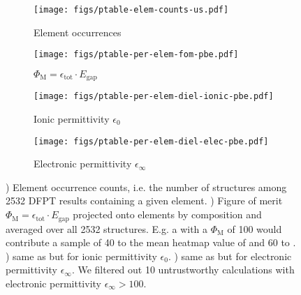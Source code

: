 \documentclass{article}
\newcommand{\fom}[1][]{\Phi_\text{M#1}}
\newcommand{\egap}{{E_\text{gap}}}
\newcommand{\epstot}{\epsilon_\text{tot}}
\begin{document}
\begin{figure}[htbp!]
    \centering
    \begin{subfigure}[b]{0.495\linewidth}
        \texttt{[image: figs/ptable-elem-counts-us.pdf]}
        \caption{Element occurrences}
        \label{fig:ptable-elem-counts-us}
    \end{subfigure}
    \begin{subfigure}[b]{0.495\linewidth}
        \texttt{[image: figs/ptable-per-elem-fom-pbe.pdf]}
        \caption{$\fom = \epstot \cdot \egap$}
        \label{fig:ptable-per-elem-fom-pbe}
    \end{subfigure}
    \begin{subfigure}[b]{0.495\linewidth}
        \texttt{[image: figs/ptable-per-elem-diel-ionic-pbe.pdf]}
        \caption{Ionic permittivity $\epsilon_0$}
        \label{fig:ptable-per-elem-diel-ionic-pbe}
    \end{subfigure}
    \begin{subfigure}[b]{0.495\linewidth}
        \texttt{[image: figs/ptable-per-elem-diel-elec-pbe.pdf]}
        \caption{Electronic permittivity $\epsilon_\infty$}
        \label{fig:ptable-per-elem-diel-elec-pbe}
    \end{subfigure}
    \caption{
        ) Element occurrence counts, i.e. the number of structures among \num{2532} DFPT results containing a given element.
        ) Figure of merit $\fom = \epstot \cdot \egap$ projected onto elements by composition and averaged over all \num{2532} structures.
        E.g. a  with a $\fom$ of 100 would contribute a sample of 40 to the mean heatmap value of  and 60 to .
        ) same as  but for ionic permittivity $\epsilon_0$.
        ) same as  but for electronic permittivity $\epsilon_\infty$.
        We filtered out 10 untrustworthy calculations with electronic permittivity $\epsilon_\infty > 100$.
    }
    \label{fig:ptable-per-elem}
\end{figure}
\end{document}
